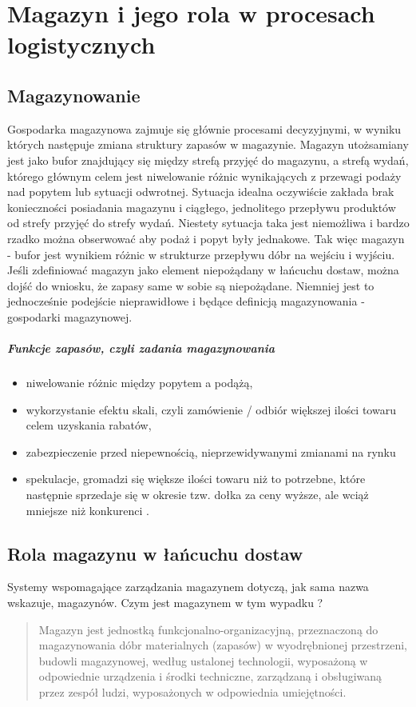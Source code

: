 \chapter{Magazyn i jego rola w procesach logistycznych}
\label{c4:c4}

\section{Magazynowanie}
	Gospodarka magazynowa zajmuje się głównie procesami decyzyjnymi, w wyniku których następuje 
	zmiana struktury zapasów w magazynie. Magazyn utożsamiany jest jako bufor znajdujący się
	między strefą przyjęć do magazynu, a strefą wydań, którego głównym celem jest niwelowanie
	różnic wynikających z przewagi podaży nad popytem lub sytuacji odwrotnej. Sytuacja idealna
	oczywiście zakłada brak konieczności posiadania magazynu i ciągłego, jednolitego przepływu
	produktów od strefy przyjęć do strefy wydań. Niestety sytuacja taka jest niemożliwa i bardzo
	rzadko można obserwować aby podaż i popyt były jednakowe. Tak więc magazyn - bufor jest
	wynikiem różnic w strukturze przepływu dóbr na wejściu i wyjściu. 
	Jeśli zdefiniować magazyn jako element niepożądany w łańcuchu dostaw, można dojść do wniosku, 
	że zapasy same w sobie są niepożądane. Niemniej jest to jednocześnie podejście nieprawidłowe i
	będące definicją magazynowania - gospodarki magazynowej.

	\paragraph{Funkcje zapasów, czyli zadania magazynowania}
	\begin{itemize}
		\item niwelowanie różnic między popytem a podążą,
		\item wykorzystanie efektu skali, czyli zamówienie / odbiór większej ilości towaru celem uzyskania
		rabatów,
		\item zabezpieczenie przed niepewnością, nieprzewidywanymi zmianami na rynku
		\item spekulacje, gromadzi się większe ilości towaru niż to potrzebne, które następnie sprzedaje się
		w okresie tzw. dołka za ceny wyższe, ale wciąż mniejsze niż konkurenci \cite{systemyLogistyczne_pfohl}.
	\end{itemize}		
	 
\section{Rola magazynu w łańcuchu dostaw}
	Systemy wspomagające zarządzania magazynem dotyczą, jak sama nazwa wskazuje, magazynów.
	Czym jest magazynem w tym wypadku ?
	\begin{quotation}
		Magazyn jest jednostką funkcjonalno-organizacyjną, przeznaczoną do magazynowania
		dóbr materialnych (zapasów) w wyodrębnionej przestrzeni, budowli magazynowej, według ustalonej
		technologii, wyposażoną w odpowiednie urządzenia i środki techniczne, zarządzaną i obsługiwaną
		przez zespół ludzi, wyposażonych w odpowiednia umiejętności.
	\end{quotation}
	
